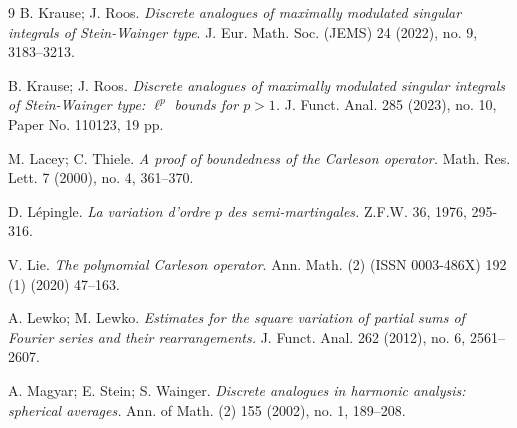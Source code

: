 \documentclass[12pt]{amsart}
\numberwithin{equation}{section}
\theoremstyle{definition}
\begin{document}
\begin{thebibliography}{9}
B. Krause; J. Roos.
\emph{Discrete analogues of maximally modulated singular integrals of Stein-Wainger type}.
J. Eur. Math. Soc. (JEMS) 24 (2022), no. 9, 3183–3213.

B. Krause; J. Roos.
\emph{Discrete analogues of maximally modulated singular integrals of Stein-Wainger type:  $\ell^p$  bounds for  $p>1$.}
J. Funct. Anal. 285 (2023), no. 10, Paper No. 110123, 19 pp.





M. Lacey; C. Thiele.
\emph{A proof of boundedness of the Carleson operator.}
Math. Res. Lett. 7 (2000), no. 4, 361–370.





D. L\'{e}pingle. \emph{La variation d'ordre $p$ des semi-martingales.}
Z.F.W. 36, 1976, 295-316.

V. Lie.
\emph{The  polynomial  Carleson  operator}.  Ann.  Math.  (2)  (ISSN 0003-486X)  192 (1)  (2020)  47–163.

A. Lewko; M. Lewko.
\emph{Estimates for the square variation of partial sums of Fourier series and their rearrangements.}
J. Funct. Anal. 262 (2012), no. 6, 2561–2607.

A. Magyar; E. Stein; S. Wainger. \emph{Discrete analogues in harmonic analysis: spherical averages.} Ann. of Math. (2) 155 (2002), no. 1, 189–208.



\end{thebibliography}
\end{document}
